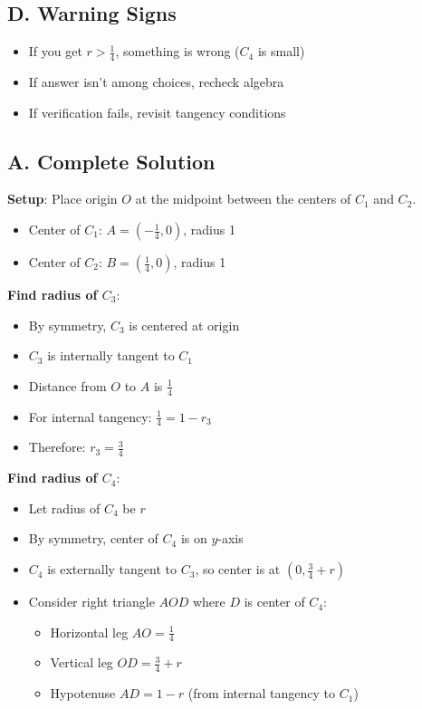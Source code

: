 \documentclass[11pt]{article}
\begin{document}
\begin{pitfallbox}
\subsection*{D. Warning Signs}
\begin{itemize}[leftmargin=*]
    \item If you get $r > \frac{1}{4}$, something is wrong ($C_4$ is small)
    \item If answer isn't among choices, recheck algebra
    \item If verification fails, revisit tangency conditions
\end{itemize}
\end{pitfallbox}

\begin{solutionbox}
\subsection*{A. Complete Solution}

\textbf{Setup}: Place origin $O$ at the midpoint between the centers of $C_1$ and $C_2$.
\begin{itemize}
    \item Center of $C_1$: $A = (-\frac{1}{4}, 0)$, radius 1
    \item Center of $C_2$: $B = (\frac{1}{4}, 0)$, radius 1
\end{itemize}

\textbf{Find radius of $C_3$}:
\begin{itemize}
    \item By symmetry, $C_3$ is centered at origin
    \item $C_3$ is internally tangent to $C_1$
    \item Distance from $O$ to $A$ is $\frac{1}{4}$
    \item For internal tangency: $\frac{1}{4} = 1 - r_3$
    \item Therefore: $r_3 = \frac{3}{4}$
\end{itemize}

\textbf{Find radius of $C_4$}:
\begin{itemize}
    \item Let radius of $C_4$ be $r$
    \item By symmetry, center of $C_4$ is on $y$-axis
    \item $C_4$ is externally tangent to $C_3$, so center is at $(0, \frac{3}{4} + r)$
    
    \item Consider right triangle $AOD$ where $D$ is center of $C_4$:
    \begin{itemize}
        \item Horizontal leg $AO = \frac{1}{4}$
        \item Vertical leg $OD = \frac{3}{4} + r$
        \item Hypotenuse $AD = 1 - r$ (from internal tangency to $C_1$)
    \end{itemize}
    

\end{itemize}
\end{solutionbox}
\end{document}
